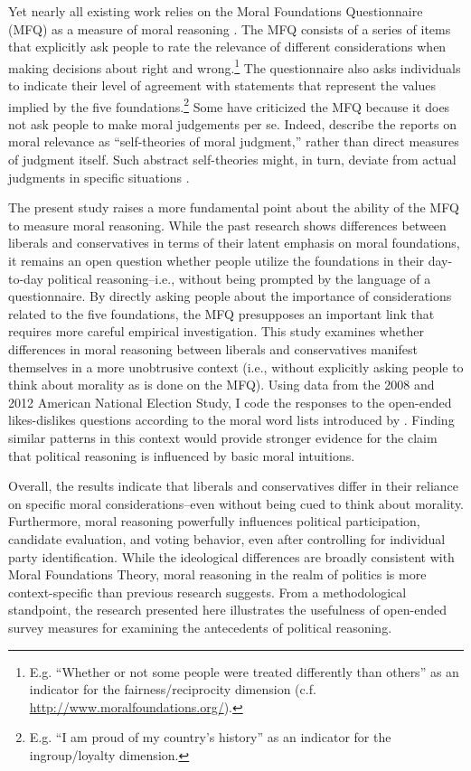 \documentclass[12pt]{article}
\begin{document}
Yet nearly all existing work relies on the Moral Foundations Questionnaire (MFQ) as a measure of moral reasoning \citep[but see][]{clifford2014linking}. The MFQ consists of a series of items that explicitly ask people to rate the relevance of different considerations when making decisions about right and wrong.\footnote{E.g. ``Whether or not some people were treated differently than others'' as an indicator for the fairness/reciprocity dimension (c.f. \url{http://www.moralfoundations.org/}).} The questionnaire also asks individuals to indicate their level of agreement with statements that represent the values implied by the five foundations.\footnote{E.g. ``I am proud of my country’s history'' as an indicator for the ingroup/loyalty dimension.} Some have criticized the MFQ because it does not ask people to make moral judgements per se. Indeed, \citet[1031]{graham2009liberals} describe the reports on moral relevance as ``self-theories of moral judgment,'' rather than direct measures of judgment itself. Such abstract self-theories might, in turn, deviate from actual judgments in specific situations \citep[see][for an alternative way to measure moral judgment]{clifford2015moral}.

The present study raises a more fundamental point about the ability of the MFQ to measure moral reasoning. While the past research shows differences between liberals and conservatives in terms of their latent emphasis on moral foundations, it remains an open question whether people utilize the foundations in their day-to-day political reasoning--i.e., without being prompted by the language of a questionnaire. By directly asking people about the importance of considerations related to the five foundations, the MFQ presupposes an important link that requires more careful empirical investigation. This study examines whether differences in moral reasoning between liberals and conservatives manifest themselves in a more unobtrusive context (i.e., without explicitly asking people to think about morality as is done on the MFQ). Using data from the 2008 and 2012 American National Election Study, I code the responses to the open-ended likes-dislikes questions according to the moral word lists introduced by \citet{graham2009liberals}. Finding similar patterns in this context would provide stronger evidence for the claim that political reasoning is influenced by basic moral intuitions. 

Overall, the results indicate that liberals and conservatives differ in their reliance on specific moral considerations--even without being cued to think about morality. Furthermore, moral reasoning powerfully influences political participation, candidate evaluation, and voting behavior, even after controlling for individual party identification. While the ideological differences are broadly consistent with Moral Foundations Theory, moral reasoning in the realm of politics is more context-specific than previous research suggests. From a methodological standpoint, the research presented here illustrates the usefulness of open-ended survey measures for examining the antecedents of political reasoning.
\end{document}

